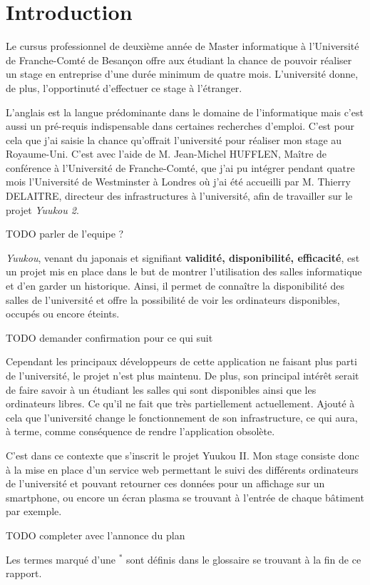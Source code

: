 \chapter{Introduction}

Le cursus professionnel de deuxi\`eme ann\'ee de Master informatique \`a l'Universit\'e de Franche-Comt\'e de Besan\c{c}on offre aux \'etudiant la chance de pouvoir r\'ealiser un stage en entreprise d'une dur\'ee minimum de quatre mois. 
L'universit\'e donne, de plus, l'opportinut\'e d'effectuer ce stage \`a l'\'etranger.

L'anglais est la langue pr\'edominante dans le domaine de l'informatique mais c'est aussi un pr\'e-requis indispensable dans certaines recherches d'emploi.
C'est pour cela que j'ai saisie la chance qu'offrait l'universit\'e pour r\'ealiser mon stage au Royaume-Uni. 
C'est avec l'aide de M. Jean-Michel HUFFLEN, Ma\^itre de conf\'erence \`a l'Universit\'e de Franche-Comt\'e, que j'ai pu int\'egrer pendant quatre mois l'Universit\'e de Westminster \`a Londres o\`u j'ai \'et\'e accueilli par M. Thierry DELAITRE, directeur des infrastructures \`a l'universit\'e, afin de travailler sur le projet \textit{Yuukou 2}.

TODO parler de l'equipe ?

\textit{Yuukou}, venant du japonais et signifiant \textbf{validit\'e, disponibilit\'e, efficacit\'e}, est un projet mis en place dans le but de montrer l'utilisation des salles informatique et d'en garder un historique.
Ainsi, il permet de conna\^itre la disponibilit\'e des salles de l'universit\'e et offre la possibilit\'e de voir les ordinateurs disponibles, occup\'es ou encore \'eteints.

TODO demander confirmation pour ce qui suit

Cependant les principaux d\'eveloppeurs de cette application ne faisant plus parti de l'universit\'e, le projet n'est plus maintenu.
De plus, son principal int\'er\^et serait de faire savoir \`a un \'etudiant les salles qui sont disponibles ainsi que les ordinateurs libres.
Ce qu'il ne fait que tr\`es partiellement actuellement.
Ajout\'e \`a cela que l'universit\'e change le fonctionnement de son infrastructure, ce qui aura, \`a terme, comme cons\'equence de rendre l'application obsol\`ete.

C'est dans ce contexte que s'inscrit le projet Yuukou II. 
Mon stage consiste donc \`a la mise en place d'un service web permettant le suivi des diff\'erents ordinateurs de l'universit\'e et pouvant retourner ces donn\'ees pour un affichage sur un smartphone, ou encore un \'ecran plasma se trouvant \`a l'entr\'ee de chaque b\^atiment par exemple.

 TODO completer avec l'annonce du plan

\vspace{1.5cm}

\noindent Les termes marqu\'e d'une $^*$ sont d\'efinis dans le glossaire se trouvant \`a la fin de ce rapport.

\clearpage
